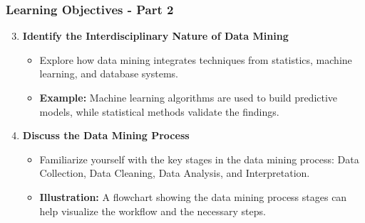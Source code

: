 \documentclass[aspectratio=169]{beamer}
\begin{document}
\begin{frame}[fragile]
    \frametitle{Learning Objectives - Part 2}
    \begin{enumerate}
        \setcounter{enumi}{2}  %
        \item \textbf{Identify the Interdisciplinary Nature of Data Mining}
            \begin{itemize}
                \item Explore how data mining integrates techniques from statistics, machine learning, and database systems.
                \item \textbf{Example:} Machine learning algorithms are used to build predictive models, while statistical methods validate the findings.
            \end{itemize}
        
        \item \textbf{Discuss the Data Mining Process}
            \begin{itemize}
                \item Familiarize yourself with the key stages in the data mining process: Data Collection, Data Cleaning, Data Analysis, and Interpretation.
                \item \textbf{Illustration:} A flowchart showing the data mining process stages can help visualize the workflow and the necessary steps.
            \end{itemize}
    \end{enumerate}
\end{frame}
\end{document}
